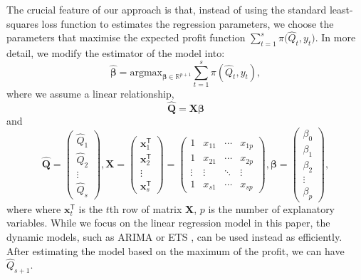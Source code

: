 \documentclass{article}
\begin{document}
The crucial feature of our approach is that, instead of using the standard least-squares loss function to estimates the regression parameters, we choose the parameters that maximise the expected profit function $\sum_{t=1}^s{\pi \big( \hat{Q}_t,y_t \big)}$. In more detail, we modify the estimator of the model into:
\[
    \hat{\boldsymbol{\beta}}=\text{argmax}_{\boldsymbol{\beta}\in \mathbb{R}^{p+1}}\displaystyle\sum_{t=1}^s{\pi(\hat{Q}_t,y_t)},
\]
where we assume a linear relationship,
\[
    \mathbf{\hat{Q}}=\mathbf{X}\boldsymbol{\beta}
\]
and
\[
    \mathbf{\hat{Q}}=
    \begin{pmatrix}
        \hat{Q}_1\\
        \hat{Q}_2\\
        \vdots\\
        \hat{Q}_s
    \end{pmatrix},
    \mathbf{X}=
    \begin{pmatrix}
        \mathbf{x}_1^{\mathsf{T}}\\
        \mathbf{x}_2^{\mathsf{T}}\\
        \vdots\\
        \mathbf{x}_s^{\mathsf{T}}
    \end{pmatrix}=
    \begin{pmatrix}
        1&x_{11}&\cdots &x_{1p}\\
        1&x_{21}&\cdots &x_{2p}\\
        \vdots &\vdots &\ddots &\vdots \\
        1&x_{s1}&\cdots &x_{sp}
    \end{pmatrix},
    \boldsymbol{\beta}=
    \begin{pmatrix}
        \beta_0\\
        \beta_1\\
        \beta_2\\
        \vdots\\
        \beta_{p}
    \end{pmatrix},
\]
where where $\mathbf{x}_t^{\mathsf{T}}$ is the $t$th row of matrix $\mathbf{X}$, $p$ is the number of explanatory variables. While we focus on the linear regression model in this paper, the dynamic models, such as ARIMA or ETS \cite{HKO08}, can be used instead as efficiently. After estimating the model based on the maximum of the profit, we can have $\hat{Q}_{s+1}$.
\end{document}
